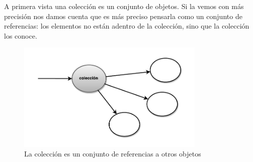 \documentclass[a4paper,12pt]{book}
\begin{document}
A primera vista una colección es un conjunto de objetos. Si la vemos con más precisión nos damos cuenta que es más
preciso pensarla como un conjunto de referencias: los elementos no están adentro de la colección, sino que la
colección los conoce. 
\\
\begin{figure}[h!]
    \centering
    \includegraphics[width=0.8\textwidth]{images/01_Grafico_Inicial.pdf}
    \caption{La colección es un conjunto de referencias a otros objetos}
\end{figure}
\FloatBarrier
\end{document}
